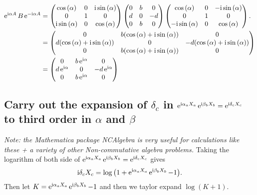 \documentclass[main.tex]{subfiles}
\begin{document}
\begin{align}
\operatorname{e}^{\mathrm{i}\alpha A}B\operatorname{e}^{-\mathrm{i}\alpha A}&=\begin{pmatrix}  \cos{(\alpha)} & 0 & \mathrm{i}\sin{(\alpha)}  \\ 0 & 1 & 0 \\ \mathrm{i}\sin{(\alpha)} & 0 & \cos{(\alpha)}  \end{pmatrix}\begin{pmatrix}  0 & b & 0  \\ d & 0 & -d \\ 0 & b & 0  \end{pmatrix}\begin{pmatrix}  \cos{(\alpha)} & 0 & -\mathrm{i}\sin{(\alpha)}  \\ 0 & 1 & 0 \\ -\mathrm{i}\sin{(\alpha)} & 0 & \cos{(\alpha)}  \end{pmatrix}.\\
&=\begin{pmatrix}  0 & b(\cos{(\alpha)}+\mathrm{i}\sin{(\alpha)}) & 0  \\ d(\cos{(\alpha)}+\mathrm{i}\sin{(\alpha)}) & 0 & -d(\cos{(\alpha)}+\mathrm{i}\sin{(\alpha)}) \\ 0 & b(\cos{(\alpha)}+\mathrm{i}\sin{(\alpha)}) & 0 \end{pmatrix}\\
&=\begin{pmatrix}  0 & b\operatorname{e}^{\mathrm{i}\alpha} & 0  \\ d\operatorname{e}^{\mathrm{i}\alpha} & 0 & -d\operatorname{e}^{\mathrm{i}\alpha} \\ 0 & b\operatorname{e}^{\mathrm{i}\alpha} & 0 \end{pmatrix}
\end{align}

\subsection{Carry out the expansion of $\delta_c$ in $\operatorname{e}^{\mathrm{i}\alpha_aX_a}\operatorname{e}^{\mathrm{i}\beta_bX_b}=\operatorname{e}^{\mathrm{i}\delta_cX_c}$ to third order in $\alpha$ and $\beta$}
\textit{Note: the \textit{Mathematica} package NCAlgebra \cite{NCalgebra} is very useful for calculations like these + a variety of other Non-commutative algebra problems.}
Taking the logarithm of both side of $\operatorname{e}^{\mathrm{i}\alpha_aX_a}\operatorname{e}^{\mathrm{i}\beta_bX_b}=\operatorname{e}^{\mathrm{i}\delta_cX_c}$ gives 
\begin{equation}
\mathrm{i}\delta_cX_c=\log{\left(1+\operatorname{e}^{\mathrm{i}\alpha_aX_a}\operatorname{e}^{\mathrm{i}\beta_bX_b}-1\right)}.
\end{equation}
Then let $K=\operatorname{e}^{\mathrm{i}\alpha_aX_a}\operatorname{e}^{\mathrm{i}\beta_bX_b}-1$ and then we taylor expand $\log{(K+1)}$.
\end{document}
